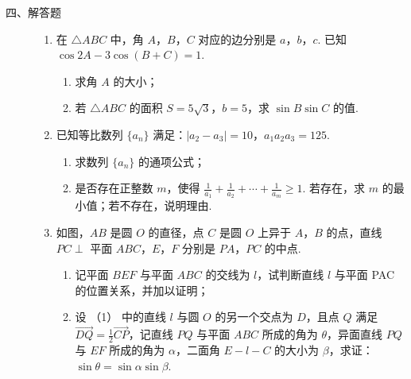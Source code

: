 \begin{description}

    \item[四、解答题]

    \begin{enumerate}[leftmargin=5pt]

      \addtocounter{enumi}{+16}

        \item 在 \(\triangle ABC\) 中，角 \(A\)，\(B\)，\(C\) 对应的边分别是 \(a\)，\(b\)，\(c\). 已知 \(\cos 2A - 3\cos (B + C) = 1\).
\begin{enumerate}
\item 求角 \(A\) 的大小；
\item 若 \(\triangle ABC\) 的面积 \(S = 5\sqrt{3}\)，\(b = 5\)，求 \(\sin B \sin C\) 的值.
\end{enumerate}

        \item 已知等比数列 \(\{a_{n}\}\) 满足：\(\left|a_2 - a_3\right| = 10\)，\(a_1a_2a_3 = 125\).
\begin{enumerate}
\item 求数列 \(\{a_{n}\}\) 的通项公式；
\item 是否存在正整数 \(m\)，使得 \(\frac{1}{a_1} + \frac{1}{a_2} + \cdots + \frac{1}{a_m} \geqslant 1\). 若存在，求 \(m\) 的最小值；若不存在，说明理由.
\end{enumerate}

        \item 如图，\(AB\) 是圆 \(O\) 的直径，点 \(C\) 是圆 \(O\) 上异于 \(A\)，\(B\) 的点，直线 \(PC \perp\) 平面 \(ABC\)，\(E\)，\(F\) 分别是 \(PA\)，\(PC\) 的中点.
\begin{enumerate}
\item 记平面 \(BEF\) 与平面 \(ABC\) 的交线为 \(l\)，试判断直线 \(l\) 与平面 PAC 的位置关系，并加以证明；
\item 设 （1） 中的直线 \(l\) 与圆 \(O\) 的另一个交点为 \(D\)，且点 \(Q\) 满足 \(\overrightarrow{DQ} = \frac{1}{2}\overrightarrow{CP}\)，记直线 \(PQ\) 与平面 \(ABC\) 所成的角为 \(\theta\)，异面直线 \(PQ\) 与 \(EF\) 所成的角为 \(\alpha\)，二面角 \(E - l - C\) 的大小为 \(\beta\)，求证： \(\sin \theta = \sin \alpha \sin \beta\).
\end{enumerate}


\end{enumerate}
\end{description}
